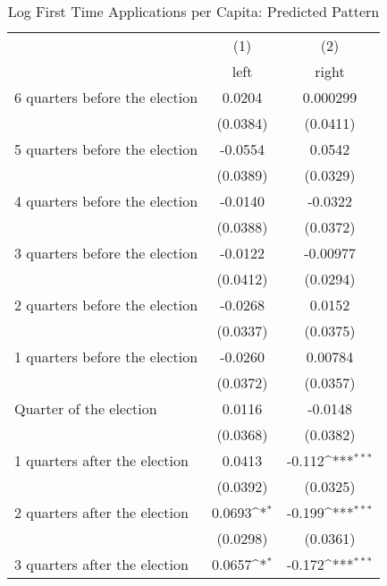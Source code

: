 \begin{table}[htbp]\centering
\def\sym#1{\ifmmode^{#1}\else\(^{#1}\)\fi}
\caption{Log First Time Applications per Capita: Predicted Pattern}
\begin{tabular}{l*{2}{c}}
\hline\hline
                    &\multicolumn{1}{c}{(1)}&\multicolumn{1}{c}{(2)}\\
                    &\multicolumn{1}{c}{left}&\multicolumn{1}{c}{right}\\
\hline
 6 quarters before the election&      0.0204         &    0.000299         \\
                    &    (0.0384)         &    (0.0411)         \\
[1em]
 5 quarters before the election&     -0.0554         &      0.0542         \\
                    &    (0.0389)         &    (0.0329)         \\
[1em]
 4 quarters before the election&     -0.0140         &     -0.0322         \\
                    &    (0.0388)         &    (0.0372)         \\
[1em]
 3 quarters before the election&     -0.0122         &    -0.00977         \\
                    &    (0.0412)         &    (0.0294)         \\
[1em]
 2 quarters before the election&     -0.0268         &      0.0152         \\
                    &    (0.0337)         &    (0.0375)         \\
[1em]
 1 quarters before the election&     -0.0260         &     0.00784         \\
                    &    (0.0372)         &    (0.0357)         \\
[1em]
Quarter of the election&      0.0116         &     -0.0148         \\
                    &    (0.0368)         &    (0.0382)         \\
[1em]
 1 quarters after the election&      0.0413         &      -0.112\sym{***}\\
                    &    (0.0392)         &    (0.0325)         \\
[1em]
 2 quarters after the election&      0.0693\sym{*}  &      -0.199\sym{***}\\
                    &    (0.0298)         &    (0.0361)         \\
[1em]
 3 quarters after the election&      0.0657\sym{*}  &      -0.172\sym{***}\\

\end{tabular}
\end{table}
